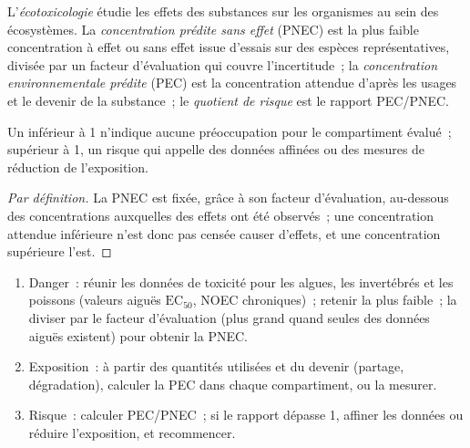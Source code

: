 \begin{definition}[Écotoxicologie]\label{def:b3:environmental-toxicology:ecotoxicology}
L'\emph{écotoxicologie} étudie les effets des substances sur
les organismes au sein des écosystèmes. La \emph{concentration prédite sans effet} (PNEC) est la plus faible
concentration à effet ou sans effet issue d'essais sur des espèces
représentatives, divisée par un facteur d'évaluation qui couvre
l'incertitude~; la \emph{concentration environnementale prédite}
(PEC) est la concentration attendue d'après les usages et le devenir de la
substance~; le \emph{quotient de risque} est le rapport PEC/PNEC.
\end{definition}

\begin{proposition}\label{prop:b3:environmental-toxicology:risk-quotient}
Un  inférieur à 1 n'indique aucune préoccupation pour le
compartiment évalué~; supérieur à 1, un risque qui appelle des données
affinées ou des mesures de réduction de l'exposition.
\end{proposition}

\begin{proof}[Par définition]
La PNEC est fixée, grâce à son facteur d'évaluation, au-dessous des
concentrations auxquelles des effets ont été observés~; une concentration
attendue inférieure n'est donc pas censée causer d'effets, et une
concentration supérieure l'est.
\end{proof}

\begin{method}\label{met:b3:environmental-toxicology:risk}
\begin{enumerate}
  \item Danger~: réunir les données de toxicité pour les algues, les invertébrés et les poissons (valeurs aiguës
        $\mathrm{EC_{50}}$, NOEC chroniques)~; retenir la plus faible~; la diviser par le facteur d'évaluation (plus grand quand
        seules des données aiguës existent) pour obtenir la PNEC.
  \item Exposition~: à partir des quantités utilisées et du devenir
        (partage, dégradation), calculer la PEC dans chaque compartiment, ou
        la mesurer.
  \item Risque~: calculer PEC/PNEC~; si le rapport dépasse 1, affiner les
        données ou réduire l'exposition, et recommencer.
\end{enumerate}
\end{method}


